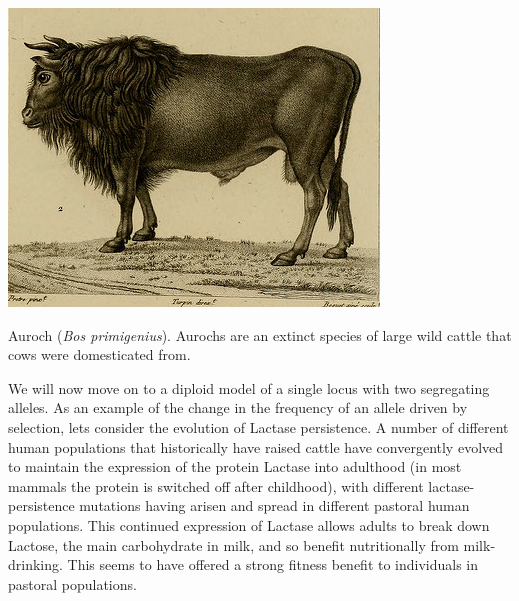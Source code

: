 \begin{marginfigure}
\begin{center}
\includegraphics[width= \textwidth]{illustration_images/single_locus_selection/cow_auroch/auroch.png}
\end{center}
\caption{Auroch ({\it Bos primigenius}). Aurochs are an extinct species of large wild cattle that cows
  were domesticated from. } \label{fig:auroch}
\end{marginfigure}

We will now move on to a diploid model of a single locus with two segregating alleles. As an example of the change in the frequency of an allele driven by selection, lets consider the evolution of Lactase persistence. A number of different human populations that historically have raised cattle have convergently evolved to maintain the expression of the protein Lactase into adulthood (in most mammals the protein is switched off after childhood), with different lactase-persistence mutations having arisen and spread in different pastoral human populations. 
This continued expression of Lactase allows adults to break down Lactose, the main carbohydrate in milk, and so benefit nutritionally from milk-drinking. This seems to have offered a strong fitness benefit to individuals in pastoral populations. 

